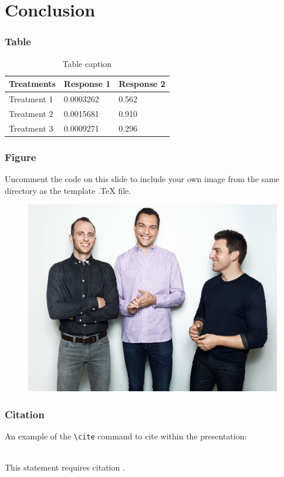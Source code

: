 \documentclass{beamer}
\begin{document}
\section{Conclusion}

\begin{frame}
\frametitle{Table}
\begin{table}
\begin{tabular}{l l l}
\toprule
\textbf{Treatments} & \textbf{Response 1} & \textbf{Response 2}\\
\midrule
Treatment 1 & 0.0003262 & 0.562 \\
Treatment 2 & 0.0015681 & 0.910 \\
Treatment 3 & 0.0009271 & 0.296 \\
\bottomrule
\end{tabular}
\caption{Table caption}
\end{table}
\end{frame}


\begin{frame}
\frametitle{Figure}
Uncomment the code on this slide to include your own image from the same directory as the template .TeX file.
\begin{figure}
\includegraphics[width=0.6\linewidth]{photo/founders}
\end{figure}
\end{frame}

\begin{frame}[fragile] %
\frametitle{Citation}
An example of the \verb|\cite| command to cite within the presentation:\\~

This statement requires citation \cite{p1}.
\end{frame}
\end{document}
